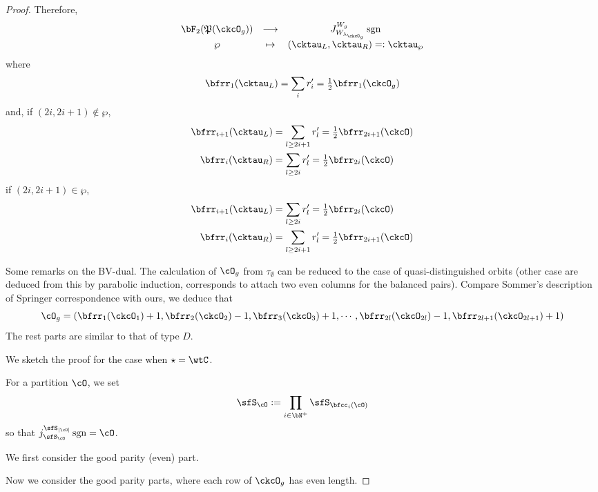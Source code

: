 \documentclass[12pt,a4paper]{amsart}
\def\abs#1{\left|{#1}\right|}
\newcommand{\sgn}{\operatorname{sgn}}
\numberwithin{equation}{section}
\theoremstyle{remark}
\def\half{{\tfrac{1}{2}}}
\def\lamckg{\lambda_{\ckcO_g}}
\def\CPP{\mathfrak{P}}
\def\sP{\wp}
\begin{document}
\begin{proof}
{  Therefore,
  \[
    \begin{array}{ccc}
      \bF_{2}(\CPP(\ckcO_{g}))&\longrightarrow
      & J_{W_{\lamckg}}^{W_{g}} \sgn \\
      \sP&\mapsto&    (\cktau_{L},\cktau_{R}) =:\cktau_{\sP}
    \end{array}
  \]
  where
  \[
  \bfrr_{1}(\cktau_{L})  =
      \sum_{i} r'_{i} =
      \half \bfrr_{1}(\ckcO_{g})
  \]
  and, if $(2i,2i+1)\notin \sP$,
  \[
    \begin{split}
      \bfrr_{i+1}(\cktau_{L}) & = \sum_{l\geq 2i+1} r'_{l}
      = \half\bfrr_{2i+1}(\ckcO)\\
      \bfrr_{i}(\cktau_{R}) & = \sum_{l\geq 2i} r'_{l}
      = \half\bfrr_{2i}(\ckcO)
    \end{split}
  \]
  if $(2i,2i+1)\in \sP$,
  \[
    \begin{split}
      \bfrr_{i+1}(\cktau_{L}) & = \sum_{l\geq 2i} r'_{l}
      = \half\bfrr_{2i}(\ckcO)\\
      \bfrr_{i}(\cktau_{R}) & = \sum_{l\geq 2i+1} r'_{l}
      = \half\bfrr_{2i+1}(\ckcO)
    \end{split}
  \]

  Some remarks on the BV-dual.
  The calculation of $\cO_{g}$ from $\tau_{\emptyset}$ can be reduced
  to the case of quasi-distinguished orbits
  (other case are deduced from this by parabolic induction, corresponds to
  attach two even columns for the balanced pairs).
  Compare Sommer's description of Springer correspondence with ours,
  we deduce that
  \[
    \cO_{g} = (\bfrr_{1}(\ckcO_{1})+1,\bfrr_{2}(\ckcO_{2})-1,\bfrr_{3}(\ckcO_{3})+1,
    \cdots, \bfrr_{2l}(\ckcO_{2l})-1,\bfrr_{2l+1}(\ckcO_{2l+1})+1)
  \]
  The rest parts are similar to that of type $D$.
  }


  We sketch the proof for the case when $\star = \wtC$.


  For a partition $\cO$, we set
  \[
    \sfS_{\cO} := \prod_{i\in \bN^{+}}\sfS_{\bfcc_{i}(\cO)}
  \]
  so that $j_{\sfS_{\cO}}^{\sfS_{\abs{\cO}}}\sgn = \cO$.


  We first consider the good parity (even) part.

 Now we consider the good parity parts, where each row of $\ckcO_{g}$ has even
 length.


\end{proof}
\end{document}
